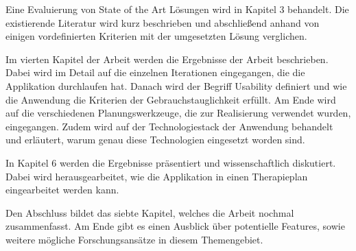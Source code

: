 Eine Evaluierung von State of the Art Lösungen wird in Kapitel 3 behandelt. Die existierende Literatur wird kurz beschrieben und abschließend anhand von einigen vordefinierten Kriterien mit der umgesetzten Lösung verglichen. 

Im vierten Kapitel der Arbeit werden die Ergebnisse der Arbeit beschrieben. Dabei wird im Detail auf die einzelnen Iterationen eingegangen, die die Applikation durchlaufen hat. Danach wird der Begriff Usability definiert und wie die Anwendung die Kriterien der Gebrauchstauglichkeit erfüllt. Am Ende wird auf die verschiedenen Planungswerkzeuge, die zur Realisierung verwendet wurden, eingegangen. Zudem wird auf der Technologiestack der Anwendung behandelt und erläutert, warum genau diese Technologien eingesetzt worden sind.

In Kapitel 6 werden die Ergebnisse präsentiert und wissenschaftlich diskutiert. Dabei wird herausgearbeitet, wie die Applikation in einen Therapieplan eingearbeitet werden kann.

Den Abschluss bildet das siebte Kapitel, welches die Arbeit nochmal zusammenfasst. Am Ende gibt es einen Ausblick über potentielle Features, sowie weitere mögliche Forschungsansätze in diesem Themengebiet.
